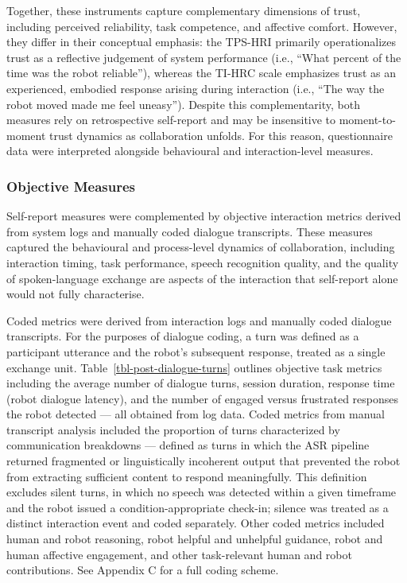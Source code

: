 \documentclass[
]{article}
\begin{document}
Together, these instruments capture complementary dimensions of trust,
including perceived reliability, task competence, and affective comfort.
However, they differ in their conceptual emphasis: the TPS-HRI primarily
operationalizes trust as a reflective judgement of system performance
(i.e., ``What percent of the time was the robot reliable''), whereas the
TI-HRC scale emphasizes trust as an experienced, embodied response
arising during interaction (i.e., ``The way the robot moved made me feel
uneasy''). Despite this complementarity, both measures rely on
retrospective self-report and may be insensitive to moment-to-moment
trust dynamics as collaboration unfolds. For this reason, questionnaire
data were interpreted alongside behavioural and interaction-level
measures.

\subsubsection{Objective Measures}\label{objective-measures}

Self-report measures were complemented by objective interaction metrics
derived from system logs and manually coded dialogue transcripts. These
measures captured the behavioural and process-level dynamics of
collaboration, including interaction timing, task performance, speech
recognition quality, and the quality of spoken-language exchange are
aspects of the interaction that self-report alone would not fully
characterise.

Coded metrics were derived from interaction logs and manually coded
dialogue transcripts. For the purposes of dialogue coding, a turn was
defined as a participant utterance and the robot's subsequent response,
treated as a single exchange unit. Table~\ref{tbl-post-dialogue-turns}
outlines objective task metrics including the average number of dialogue
turns, session duration, response time (robot dialogue latency), and the
number of engaged versus frustrated responses the robot detected --- all
obtained from log data. Coded metrics from manual transcript analysis
included the proportion of turns characterized by communication
breakdowns --- defined as turns in which the ASR pipeline returned
fragmented or linguistically incoherent output that prevented the robot
from extracting sufficient content to respond meaningfully. This
definition excludes silent turns, in which no speech was detected within
a given timeframe and the robot issued a condition-appropriate check-in;
silence was treated as a distinct interaction event and coded
separately. Other coded metrics included human and robot reasoning,
robot helpful and unhelpful guidance, robot and human affective
engagement, and other task-relevant human and robot contributions. See
Appendix C for a full coding scheme.
\end{document}
